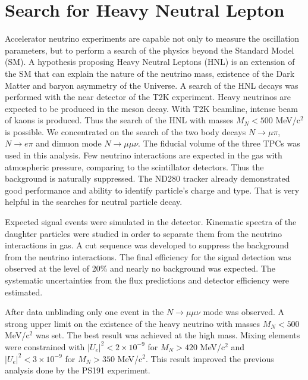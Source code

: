 \documentclass[./main.tex]{subfiles}
\begin{document}
\section{Search for Heavy Neutral Lepton}
Accelerator neutrino experiments are capable not only to measure the oscillation parameters, but to perform a search of the physics beyond the Standard Model (SM). A hypothesis proposing Heavy Neutral Leptons (HNL) is an extension of the SM that can explain the nature of the neutrino mass, existence of the Dark Matter and baryon asymmetry of the Universe. A search of the HNL decays was performed with the near detector of the T2K experiment. Heavy neutrinos are expected to be produced in the meson decay. With T2K beamline, intense beam of kaons is produced. Thus the search of the HNL with masses $M_N < 500$ MeV/c${}^2$ is possible. We concentrated on the search of the two body decays $N\to\mu\pi$, $N\to e\pi$ and dimuon mode $N\to\mu\mu\nu$. The fiducial volume of the three TPCs was used in this analysis. Few neutrino interactions are expected in the gas with atmospheric pressure, comparing to the scintillator detectors. Thus the background is naturally suppressed. The ND280 tracker already demonstrated good performance and ability to identify particle's charge and type. That is very helpful in the searches for neutral particle decay.

Expected signal events were simulated in the detector. Kinematic spectra of the daughter particles were studied in order to separate them from the neutrino interactions in gas. A cut sequence was developed to suppress the background from the neutrino interactions. The final efficiency for the signal detection was observed at the level of 20\% and nearly no background was expected. The systematic uncertainties from the flux predictions and detector efficiency were estimated.

After data unblinding only one event in the $N\to\mu\mu\nu$ mode was observed. A strong upper limit on the existence of the heavy neutrino with masses $M_N < 500$ MeV/c${}^2$ was set. The best result was achieved at the high mass. Mixing elements were constrained with $\left|U_e\right|^2 < 2\times10^{-9}$ for $M_N > 420$ MeV/c${}^2$ and $\left|U_e\right|^2 < 3\times10^{-9}$ for $M_N > 350$ MeV/c${}^2$. This result improved the previous analysis done by the PS191 experiment.
\end{document}
